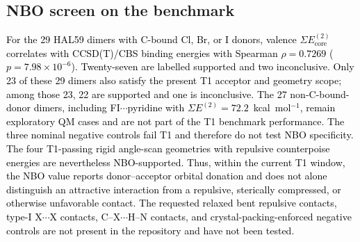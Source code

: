 \documentclass[journal=jcisd8,manuscript=article,layout=two-column]{achemso}
\newcommand{\tcb}[1]{{\textcolor{black}{#1}}}
\newcommand{\ET}{E^{(2)}}
\newcommand{\kcal}{kcal\,mol$^{-1}$}
\begin{document}
\subsection{NBO screen on the benchmark}
\tcb{For the 29 HAL59 dimers with C-bound Cl, Br, or I donors, valence $\Sigma E^{(2)}_{\mathrm{core}}$ correlates with CCSD(T)/CBS binding energies with Spearman $\rho=0.7269$ ($p=7.98\times10^{-6}$). Twenty-seven are labelled supported and two inconclusive. Only 23 of these 29 dimers also satisfy the present T1 acceptor and geometry scope; among those 23, 22 are supported and one is inconclusive. The 27 non-C-bound-donor dimers, including FI$\cdots$pyridine with $\Sigma E^{(2)}=72.2$~kcal~mol$^{-1}$, remain exploratory QM cases and are not part of the T1 benchmark performance. The three nominal negative controls fail T1 and therefore do not test NBO specificity. The four T1-passing rigid angle-scan geometries with repulsive counterpoise energies are nevertheless NBO-supported. Thus, within the current T1 window, the NBO value reports donor--acceptor orbital donation and does not alone distinguish an attractive interaction from a repulsive, sterically compressed, or otherwise unfavorable contact. The requested relaxed bent repulsive contacts, type-I X$\cdots$X contacts, C--X$\cdots$H--N contacts, and crystal-packing-enforced negative controls are not present in the repository and have not been tested.}
\end{document}
